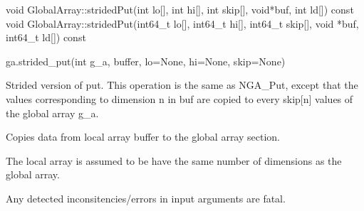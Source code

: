\documentclass[12pt]{article}
\begin{document}
\begin{cxxapi}
\begin{cxxcode}
void GlobalArray::stridedPut(int lo[], int hi[], int skip[],
                             void*buf, int ld[]) const
void GlobalArray::stridedPut(int64_t lo[], int64_t hi[], int64_t skip[],
                             void *buf, int64_t ld[]) const
\end{cxxcode}
\begin{funcargs}
\end{funcargs}
\end{cxxapi}

\begin{pyapi}
\begin{pycode}
ga.strided_put(int g_a, buffer, lo=None, hi=None, skip=None)
\end{pycode}
\begin{funcargs}
\end{funcargs}
\end{pyapi}

\ncoll

\begin{desc}

Strided version of put.  This operation is the same as NGA_Put, except that the
values corresponding to dimension n in buf are copied to every skip[n] values
of the global array g_a.

Copies data from local array buffer to the global array section.

The local array is assumed to be have the same number of dimensions as the
global array.

Any detected inconsitencies/errors in input arguments are fatal.

\end{desc}


\end{document}

